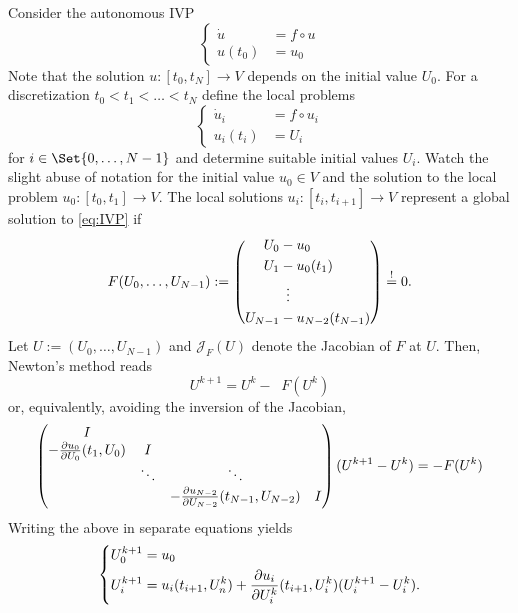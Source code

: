Consider the autonomous \ac{IVP}
\begin{equation}
  \label{eq:IVP}
  \left\{
  \begin{aligned}
    \dot u &= f \circ u \\
    u(t_0) &= u_0
  \end{aligned}
  \right.
\end{equation}
Note that the solution $u : [t_0,t_N] \to V $ depends on the initial value $U_0$.
For a discretization $t_0 < t_1 < \ldots < t_N$
define the local problems
\begin{equation}
  \left\{
  \begin{aligned}
    \dot u_i &= f \circ u_i \\
    u_i(t_i) &= U_i
  \end{aligned}
  \right.
\end{equation}
for $i \in \Set{0,\ldots,N-1}$
and determine suitable initial values $U_i$.
Watch the slight abuse of notation for the initial value $u_0 \in V$ and the solution to the local problem $u_0 : [t_0,t_1] \to V$.
The local solutions $u_i : [t_i,t_{i+1}] \to V$ represent a global solution to \eqref{eq:IVP} if
\begin{equation}
  F(U_0, \ldots, U_{N-1}) :=
  \left(
  \begin{aligned}
    U_0 &- u_0 \\
    U_1 &- u_0(t_1) \\
    &\vdotswithin{-} \\
    U_{N-1} &- u_{N-2}(t_{N-1})
  \end{aligned}
  \right)
  \overset{!}{=} 0.
\end{equation}
Let $U := (U_0, \ldots, U_{N-1})$ and $\mathcal J_F(U)$ denote the Jacobian of $F$ at $U$.
Then, Newton's method reads
\begin{equation}
  U^{k+1} = U^k - \mathop{\mathcal J_F(U^k)^{-1}} F(U^k)
\end{equation}
or, equivalently, avoiding the inversion of the Jacobian,
\begin{equation}
  \begin{pmatrix}
    I \\
    -\pdiff{U_0}{u_0}(t_1, U_0) & I \\
    & \ddots & \ddots \\
    && -\pdiff{U_{N-2}}{u_{N-2}}(t_{N-1}, U_{N-2}) & I
  \end{pmatrix}
  (U^{k+1} - U^k) = -F(U^k)
\end{equation}
Writing the above in separate equations yields
\begin{equation}
  \left\{
  \begin{aligned}
    U^{k+1}_0 &= u_0 \\
    U^{k+1}_i &= u_i(t_{i+1}, U^k_n) + \pdiff{U^k_i}{u_i}(t_{i+1}, U^k_i) (U^{k+1}_i - U^k_i).
  \end{aligned}
  \right.
\end{equation}
